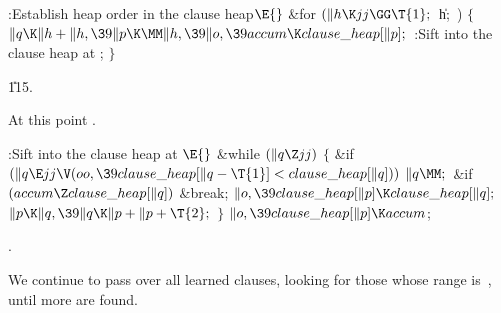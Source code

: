 \B{}:Establish heap order in the clause heap\X${}\E{}$\6
\&{for} ${}(\|h\K\\{jj}\GG\T{1};{}$ \|h; \,)\5
${}\{{}$\1\6
${}\|q\K\|h+\|h,\39\|p\K\MM\|h,\39\|o,\39\\{accum}\K\\{clause\_heap}[\|p];{}$\6
:Sift  into the clause heap at \X;\6
\4${}\}{}$\2\par
\U115.\fi

At this point .

\Y\B\4:Sift  into the clause heap at \X${}\E{}$\6
\&{while} ${}(\|q\Z\\{jj}){}$\5
${}\{{}$\1\6
\&{if} ${}(\|q\E\\{jj}\V(\\{oo},\39\\{clause\_heap}[\|q-\T{1}]<\\{clause%
\_heap}[\|q])){}$\1\5
${}\|q\MM;{}$\2\6
\&{if} ${}(\\{accum}\Z\\{clause\_heap}[\|q]){}$\1\5
\&{break};\2\6
${}\|o,\39\\{clause\_heap}[\|p]\K\\{clause\_heap}[\|q];{}$\6
${}\|p\K\|q,\39\|q\K\|p+\|p+\T{2};{}$\6
\4${}\}{}$\2\6
${}\|o,\39\\{clause\_heap}[\|p]\K\\{accum}{}$;\par
{}.\fi

We continue to pass over all learned clauses, looking for
those
whose range is~, until  more are found.

